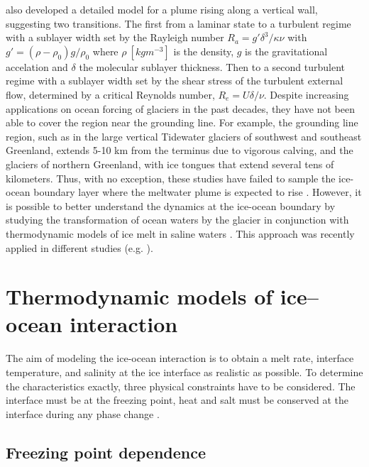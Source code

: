 \documentclass[11pt,a4paper]{article}
\begin{document}
	\cite{wells2008geophysical} also developed a detailed model for a plume rising along a vertical wall, suggesting two transitions. The first from a laminar state to a turbulent regime with a sublayer width set by the Rayleigh number $R_a = g'\delta^3/\kappa\nu$ with $g' = (\rho-\rho_0) g/\rho_0$ where $\rho\ [kgm^{-3}]$ is the density, $g$ is the gravitational accelation and $\delta$ the molecular sublayer thickness. Then to a second turbulent regime with a sublayer width set by the shear stress of the turbulent external flow, determined by a critical Reynolds number, $R_e = U\delta/\nu$. Despite increasing applications on ocean forcing of glaciers in the past decades, they have not been able to cover the region near the grounding line. For example, the grounding line region, such as in the large vertical Tidewater glaciers of southwest and southeast Greenland, extends 5-10 km from the terminus due to vigorous calving, and the glaciers of northern Greenland, with ice tongues that extend several tens of kilometers. Thus, with no exception, these studies have failed to sample the ice-ocean boundary layer where the meltwater plume is expected to rise \citep{straneo2012characteristics}. However, it is possible to better understand the dynamics at the ice-ocean boundary by studying the transformation of ocean waters by the glacier in conjunction with thermodynamic models of ice melt in saline waters \citep{holland1999modeling}. This approach was recently applied in different studies (e.g. \cite{jenkins2011convection,gayen2016simulation,hewitt2020subglacial}).
	
	
	
	\section{Thermodynamic models of ice–ocean interaction}
	
    	The aim of modeling the ice-ocean interaction is to obtain a melt rate, interface temperature, and salinity at the ice interface  as realistic as possible. To determine the characteristics exactly, three physical constraints have to be considered. The interface must be at the freezing point, heat and salt must be conserved at the interface during any phase change \citep{holland1999modeling}.
        
        \subsection{Freezing point dependence}
        
\end{document}
